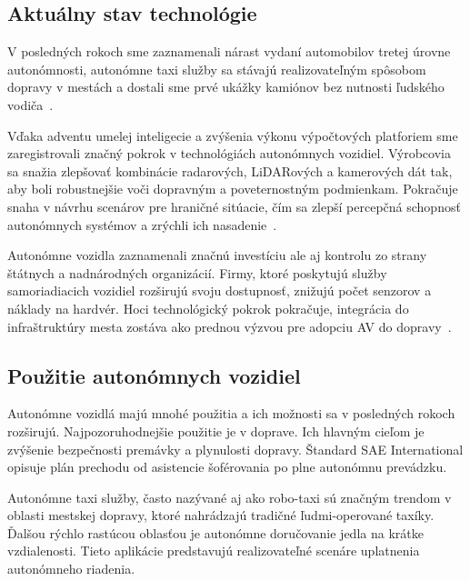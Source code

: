 \subsection{Aktuálny stav technológie}
V posledných rokoch sme zaznamenali nárast vydaní automobilov tretej úrovne autonómnosti, autonómne taxi služby sa stávajú realizovateľným spôsobom dopravy v mestách a dostali sme prvé ukážky kamiónov bez nutnosti ľudského vodiča~\cite{mckinsey2026}.\par
Vďaka adventu umelej inteligecie a zvýšenia výkonu výpočtových platforiem sme zaregistrovali značný pokrok v technológiách autonómnych vozidiel. Výrobcovia sa snažia zlepšovať kombinácie radarových, LiDARových a kamerových dát tak, aby boli robustnejšie voči dopravným a poveternostným podmienkam. Pokračuje snaha v návrhu scenárov pre hraničné sitúacie, čím sa zlepší percepčná schopnosť autonómnych systémov a zrýchli ich nasadenie~\cite{motortrend2026, nvidia2026}.\par
Autonómne vozidla zaznamenali značnú investíciu ale aj kontrolu zo strany štátnych a nadnárodných organizácií. Firmy, ktoré poskytujú služby samoriadiacich vozidiel rozširujú svoju dostupnosť, znižujú počet senzorov a náklady na hardvér. Hoci technológický pokrok pokračuje, integrácia do infraštruktúry mesta zostáva ako prednou výzvou pre adopciu AV do dopravy~\cite{theguardian2026, waymo2026}.
\subsection{Použitie autonómnych vozidiel}
Autonómne vozidlá majú mnohé použitia a ich možnosti sa v posledných rokoch rozširujú. Najpozoruhodnejšie použitie je v doprave. Ich hlavným cieľom je zvýšenie bezpečnosti premávky a plynulosti dopravy. Štandard SAE International opisuje plán prechodu od asistencie šoférovania po plne autonómnu prevádzku.\par
Autonómne taxi služby, často nazývané aj ako robo-taxi sú značným trendom v oblasti mestskej dopravy, ktoré nahrádzajú tradičné ľudmi-operované taxíky. Ďalšou rýchlo rastúcou oblasťou je autonómne doručovanie jedla na krátke vzdialenosti. Tieto aplikácie predstavujú realizovateľné scenáre uplatnenia autonómneho riadenia.
